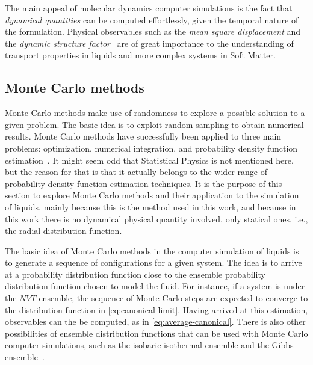 The main appeal of molecular dynamics computer simulations is the fact that
\emph{dynamical quantities} can be computed effortlessly, given the temporal nature 
of the formulation. Physical observables such
as the \emph{mean square displacement} and the \emph{dynamic structure factor}~\cite{dhontIntroductionDynamicsColloids1996,hansenTheorySimpleLiquids2013}
are of great importance to the understanding of transport properties in liquids and
more complex systems in Soft Matter.

\subsection{Monte Carlo methods}
Monte Carlo methods make use of randomness to explore a possible solution to a
given problem. The basic idea is to exploit random sampling to obtain numerical
results. Monte Carlo methods have successfully been applied to
three main problems: optimization, numerical integration, and probability density
function estimation~\cite{kroeseWhyMonteCarlo2014}. It might seem odd that Statistical
Physics is not mentioned here, but the reason for that is that it actually belongs to
the wider range of probability density function estimation techniques. It is the
purpose of this section to explore Monte Carlo methods and their application to
the simulation of liquids, mainly because this is the method used in this
work, and because in this work there is no dynamical physical quantity involved,
only statical ones, i.e., the radial distribution function.

The basic idea of Monte Carlo methods in the computer simulation of liquids is to
generate a sequence of configurations for a given system. The idea is to arrive at a
probability distribution function close to the ensemble probability distribution
function chosen to model the fluid. For instance, if a system
is under the $NVT$ ensemble, the sequence of Monte Carlo steps are expected to converge
to the distribution function in \autoref{eq:canonical-limit}. Having arrived at this
estimation, observables can the be computed, as in \autoref{eq:average-canonical}.
There is also other possibilities of ensemble distribution functions that can be
used with Monte Carlo computer simulations, such as the isobaric-isothermal ensemble
and the Gibbs ensemble~\cite{frenkelUnderstandingMolecularSimulation2001}.


